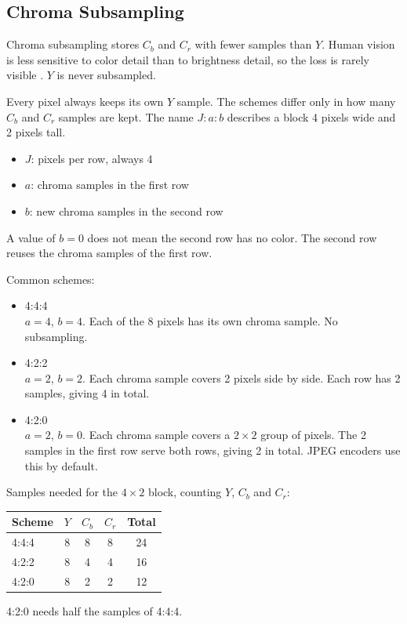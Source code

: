 \documentclass[11pt,a4paper]{article}
\begin{document}
\subsection{Chroma Subsampling}

Chroma subsampling stores $C_b$ and $C_r$ with fewer samples than $Y$. Human vision is less sensitive to color detail than to brightness detail, so the loss is rarely visible \cite{gonzalez}. $Y$ is never subsampled.

Every pixel always keeps its own $Y$ sample. The schemes differ only in how many $C_b$ and $C_r$ samples are kept. The name $J{:}a{:}b$ describes a block 4 pixels wide and 2 pixels tall.
\begin{itemize}
\item $J$: pixels per row, always 4
\item $a$: chroma samples in the first row
\item $b$: new chroma samples in the second row
\end{itemize}
A value of $b=0$ does not mean the second row has no color. The second row reuses the chroma samples of the first row.

Common schemes:
\begin{itemize}
\item 4:4:4\\
  $a=4$, $b=4$. Each of the 8 pixels has its own chroma sample. No subsampling.
\item 4:2:2\\
  $a=2$, $b=2$. Each chroma sample covers 2 pixels side by side. Each row has 2 samples, giving 4 in total.
\item 4:2:0\\
  $a=2$, $b=0$. Each chroma sample covers a $2\times2$ group of pixels. The 2 samples in the first row serve both rows, giving 2 in total. JPEG encoders use this by default.
\end{itemize}
Samples needed for the $4\times2$ block, counting $Y$, $C_b$ and $C_r$:
\begin{center}
\begin{tabular}{lcccc}
Scheme & $Y$ & $C_b$ & $C_r$ & Total \\
\hline
4:4:4 & 8 & 8 & 8 & 24 \\
4:2:2 & 8 & 4 & 4 & 16 \\
4:2:0 & 8 & 2 & 2 & 12 \\
\end{tabular}
\end{center}
4:2:0 needs half the samples of 4:4:4.
\end{document}
